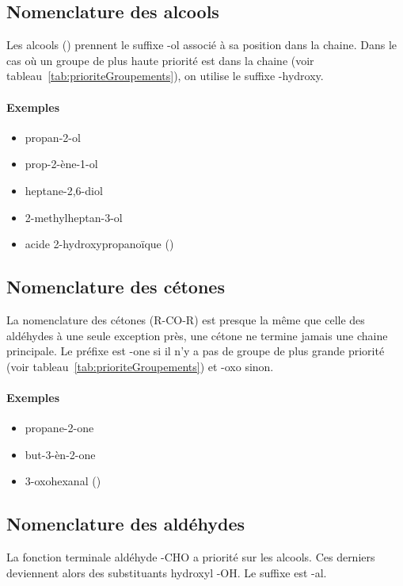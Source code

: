 \subsection{Nomenclature des alcools}
Les alcools () prennent le suffixe -ol associé à sa position dans la chaine.
Dans le cas où un groupe de plus haute priorité est dans la chaine
(voir tableau~\ref{tab:prioriteGroupements}), on utilise le suffixe -hydroxy.

\paragraph{Exemples}
\begin{itemize}
  \item  propan-2-ol
  \item  prop-2-ène-1-ol
  \item  heptane-2,6-diol
  \item  2-methylheptan-3-ol
  \item  acide 2-hydroxypropano\"ique ()
\end{itemize}

\subsection{Nomenclature des cétones} 
La nomenclature des cétones (R-CO-R) est presque la même que celle des aldéhydes à une seule exception près, une cétone ne termine jamais une chaine principale.
Le préfixe est -one si il n'y a pas de groupe de plus grande priorité
(voir tableau~\ref{tab:prioriteGroupements}) et -oxo sinon.

\paragraph{Exemples}
\begin{itemize}
  \item propane-2-one
  \item but-3-èn-2-one
  \item 3-oxohexanal ()
\end{itemize}

\subsection{Nomenclature des aldéhydes} 
La fonction terminale aldéhyde -CHO a priorité sur les alcools.
Ces derniers deviennent alors des substituants hydroxyl -OH.
Le suffixe est -al.

